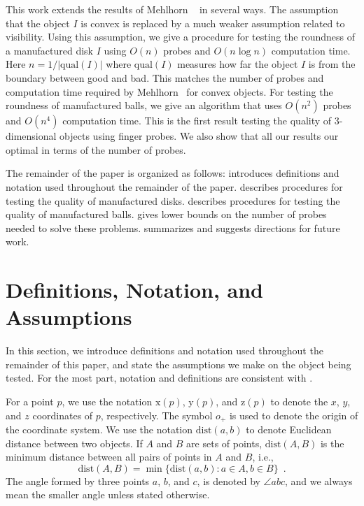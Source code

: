 \documentclass[11pt]{article}
\newcommand{\origin}{o_+}
\newcommand{\dist}{\mathrm{dist}}
\newcommand{\qual}{\mathrm{qual}}
\newcommand{\x}{\mathrm{x}}
\newcommand{\y}{\mathrm{y}}
\newcommand{\z}{\mathrm{z}}
\begin{document}
This work extends the results of Mehlhorn \etal\ \cite{msy97,sy95} in
several ways.  The assumption that the object $I$ is convex is
replaced by a much weaker assumption related to visibility.  Using
this assumption, we give a procedure for testing the roundness of a
manufactured disk $I$ using $O(n)$ probes and $O(n\log n)$ computation
time.  Here $n=1/|\qual(I)|$ where $\qual(I)$ measures how far the
object $I$ is from the boundary between good and bad.  This matches
the number of probes and computation time required by Mehlhorn \etal\
for convex objects.  For testing the roundness of manufactured balls,
we give an algorithm that uses $O(n^2)$ probes and $O(n^4)$
computation time.  This is the first result testing the quality of
3-dimensional objects using finger probes.  We also show that all our
results our optimal in terms of the number of probes.

The remainder of the paper is organized as follows: 
introduces definitions and notation used throughout the remainder of
the paper. \Secref{disks} describes procedures for testing the quality
of manufactured disks.  \Secref{balls} describes procedures for
testing the quality of manufactured balls.  
gives lower bounds on the number of probes needed to solve these
problems.  \Secref{conclusions} summarizes and suggests directions for
future work.


\section{Definitions, Notation, and Assumptions}\seclabel{notation}

In this section, we introduce definitions and notation used throughout
the remainder of this paper, and state the assumptions we make on the
object being tested.  For the most part, notation and definitions are
consistent with \cite{msy97,sy95}.

For a point $p$, we use the notation $\x(p)$, $\y(p)$, and $\z(p)$ to
denote the $x$, $y$, and $z$ coordinates of $p$, respectively.  The
symbol $\origin$ is used to denote the origin of the coordinate system.  We
use the notation $\dist(a,b)$ to denote Euclidean distance between two
objects.  If $A$ and $B$ are sets of points, $\dist(A,B)$ is the
minimum distance between all pairs of points in $A$ and
$B$, i.e.,
\begin{equation} 
\dist(A,B) = \min\{\dist(a,b) : a\in A, b\in B\} \enspace .
\end{equation}
The angle formed by three points $a$, $b$, and $c$, is denoted by
$\angle abc$, and we always mean the smaller angle unless stated
otherwise.
\end{document}
